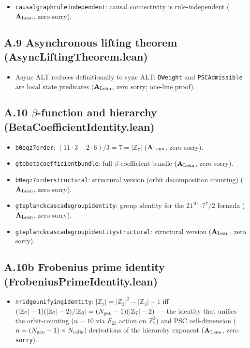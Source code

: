 \documentclass[11pt]{article}
\theoremstyle{remark}
\newcommand{\ZS}{\mathbb{Z}_7}
\newcommand{\ZZ}{\mathbb{Z}}
\newcommand{\lean}[1]{%
  \penalty-100
  \begingroup\def\_{\textunderscore\allowbreak}\texttt{#1}\endgroup}
\newcommand{\CatAL}{\ensuremath{\textbf{A}_{\rm Lean}}}
\begin{document}
\begin{appendices}
\begin{itemize}[noitemsep]
\item \lean{causal\_graph\_rule\_independent}: causal connectivity is
  rule-independent ($\CatAL$, zero sorry).
\end{itemize}

\subsection*{A.9 Asynchronous lifting theorem (AsyncLiftingTheorem.lean)}

\begin{itemize}[noitemsep]
\item Async ALT reduces definitionally to sync ALT: \texttt{DWeight} and
  \texttt{PSCAdmissible} are local state predicates ($\CatAL$, zero sorry;
  one-line proof).
\end{itemize}

\subsection*{A.10 $\beta$-function and hierarchy (BetaCoefficientIdentity.lean)}

\begin{itemize}[noitemsep]
\item \lean{b0\_eq\_z7\_order}: $(11\cdot3-2\cdot6)/3 = 7 = |\ZS|$
  ($\CatAL$, zero sorry).
\item \lean{gte\_beta\_coefficient\_bundle}: full $\beta$-coefficient bundle
  ($\CatAL$, zero sorry).
\item \lean{b0\_eq\_z7\_order\_structural}: structural version (orbit
  decomposition counting) ($\CatAL$, zero sorry).
\item \lean{gte\_planck\_cascade\_group\_identity}: group identity for the
  $21^{10}\cdot7^7/2$ formula ($\CatAL$, zero sorry).
\item \lean{gte\_planck\_cascade\_group\_identity\_structural}: structural
  version ($\CatAL$, zero sorry).
\end{itemize}

\subsection*{A.10b Frobenius prime identity (FrobeniusPrimeIdentity.lean)}

\begin{itemize}[noitemsep]
\item \lean{n\_ridge\_unifying\allowbreak\_identity}: $|\ZS| = |\ZZ_3|^2-|\ZZ_3|+1$ iff
  $(|\ZS|-1)(|\ZS|-2)/|\ZZ_3| = (N_{\rm gen}-1)(|\ZS|-2)$ --- the identity
  that unifies the orbit-counting ($n=10$ via $F_{21}$ action on $\ZS^3$)
  and PSC cell-dimension ($n=(N_{\rm gen}-1)\times N_{\rm cells}$) derivations
  of the hierarchy exponent ($\CatAL$, zero \texttt{sorry}).
\end{itemize}


\end{appendices}
\end{document}
